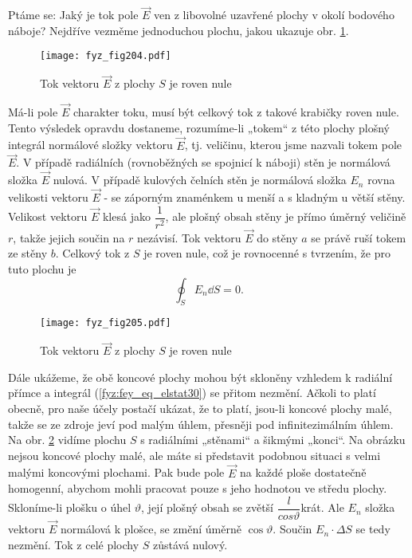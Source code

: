 {    Ptáme se: Jaký je tok pole \(\vec{E}\) ven z libovolné uzavřené plochy v okolí bodového náboje? 
    Nejdříve vezměme jednoduchou plochu, jakou ukazuje obr. \ref{fyz:fig204}. 
    
    \begin{figure}[ht!]  %
      \centering
      \texttt{[image: fyz\_fig204.pdf]}
      \caption{Tok vektoru \(\vec{E}\) z plochy \(S\) je roven nule}
     \label{fyz:fig204} 
    \end{figure}
    
    Má-li pole \(\vec{E}\) charakter toku, musí být celkový tok z takové krabičky roven nule. Tento 
    výsledek opravdu dostaneme, rozumíme-li „tokem“ z této plochy plošný integrál normálové složky 
    vektoru \(\vec{E}\), tj. veličinu, kterou jsme nazvali tokem pole \(\vec{E}\). V případě 
    radiálních (rovnoběžných se spojnicí k náboji) stěn je normálová složka \(\vec{E}\) nulová. V 
    případě kulových čelních stěn je normálová složka \(E_n\) rovna velikosti vektoru \(\vec{E}\) - 
    se záporným znaménkem u menší a s kladným u větší stěny. Velikost vektoru \(\vec{E}\) klesá 
    jako \(\dfrac{1}{r^2}\), ale plošný obsah stěny je přímo úměrný veličině \(r\), takže jejich 
    součin na \(r\) nezávisí. Tok vektoru \(\vec{E}\) do stěny \(a\) se právě ruší tokem ze stěny 
    \(b\). Celkový tok z \(S\) je roven nule, což je rovnocenné s tvrzením, že pro tuto plochu je
    \begin{equation}\label{fyz:fey_eq_elstat30}
    \oint_SE_n\dd{S} = 0.
    \end{equation}
    
    \begin{figure}[ht!]
      \centering
      \texttt{[image: fyz\_fig205.pdf]}
      \caption{Tok vektoru \(\vec{E}\) z plochy \(S\) je roven nule}
      \label{fyz:fig205} 
    \end{figure}

    Dále ukážeme, že obě koncové plochy mohou být skloněny vzhledem k radiální přímce a integrál 
    (\ref{fyz:fey_eq_elstat30}) se přitom nezmění. Ačkoli to platí obecně, pro naše účely postačí 
    ukázat, že to platí, jsou-li koncové plochy malé, takže se ze zdroje jeví pod malým úhlem, 
    přesněji pod infinitezimálním úhlem. Na obr. \ref{fyz:fig205} vidíme plochu \(S\) s 
    radiálními „stěnami“ a šikmými „konci“. Na obrázku nejsou koncové plochy malé, ale máte si 
    představit podobnou situaci s velmi malými koncovými plochami. Pak bude pole \(\vec{E}\) na 
    každé ploše dostatečně homogenní, abychom mohli pracovat pouze s jeho hodnotou ve středu 
    plochy. Skloníme-li plošku o úhel \(\vartheta\), její plošný obsah se zvětší 
    \(\dfrac{l}{cos\vartheta}\)krát. Ale \(E_n\) složka vektoru \(\vec{E}\) normálová k plošce, se 
    změní úměrně \(\cos\vartheta\). Součin \(E_n\cdot\Delta S\) se tedy nezmění. Tok z celé plochy 
    \(S\) zůstává nulový.
      
}
